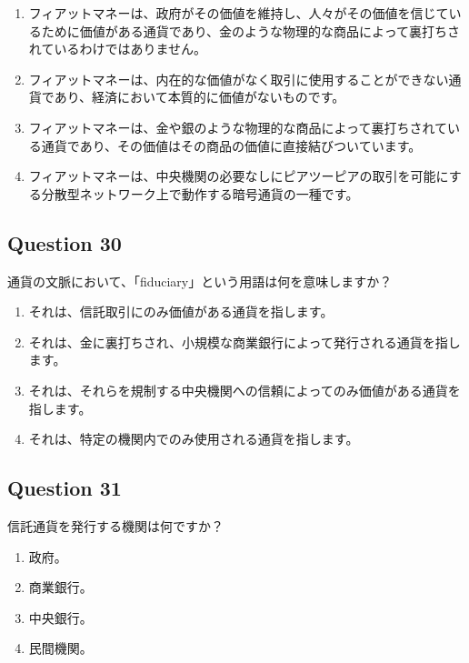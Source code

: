 \documentclass[12pt,a4paper]{article}
\begin{document}
\begin{enumerate}[label=\Alph*., leftmargin=*]
\item フィアットマネーは、政府がその価値を維持し、人々がその価値を信じているために価値がある通貨であり、金のような物理的な商品によって裏打ちされているわけではありません。
\item フィアットマネーは、内在的な価値がなく取引に使用することができない通貨であり、経済において本質的に価値がないものです。
\item フィアットマネーは、金や銀のような物理的な商品によって裏打ちされている通貨であり、その価値はその商品の価値に直接結びついています。
\item フィアットマネーは、中央機関の必要なしにピアツーピアの取引を可能にする分散型ネットワーク上で動作する暗号通貨の一種です。
\end{enumerate}

\bigskip


\subsection*{Question 30}
通貨の文脈において、「fiduciary」という用語は何を意味しますか？

\begin{enumerate}[label=\Alph*., leftmargin=*]
\item それは、信託取引にのみ価値がある通貨を指します。
\item それは、金に裏打ちされ、小規模な商業銀行によって発行される通貨を指します。
\item それは、それらを規制する中央機関への信頼によってのみ価値がある通貨を指します。
\item それは、特定の機関内でのみ使用される通貨を指します。
\end{enumerate}

\bigskip


\subsection*{Question 31}
信託通貨を発行する機関は何ですか？

\begin{enumerate}[label=\Alph*., leftmargin=*]
\item 政府。
\item 商業銀行。
\item 中央銀行。
\item 民間機関。
\end{enumerate}

\bigskip
\end{document}

